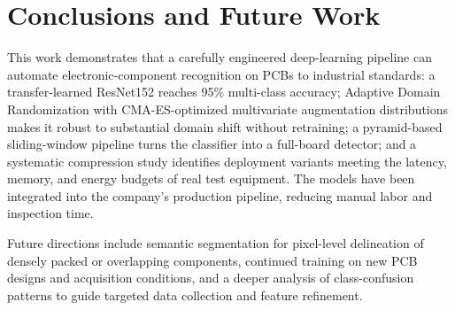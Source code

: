 \documentclass[10pt,twocolumn,a4paper]{article}
\begin{document}
\section{Conclusions and Future Work}
This work demonstrates that a carefully engineered deep-learning pipeline can automate electronic-component recognition on PCBs to industrial standards: a transfer-learned ResNet152 reaches 95\% multi-class accuracy; Adaptive Domain Randomization with CMA-ES-optimized multivariate augmentation distributions makes it robust to substantial domain shift without retraining; a pyramid-based sliding-window pipeline turns the classifier into a full-board detector; and a systematic compression study identifies deployment variants meeting the latency, memory, and energy budgets of real test equipment. The models have been integrated into the company's production pipeline, reducing manual labor and inspection time.

Future directions include semantic segmentation for pixel-level delineation of densely packed or overlapping components, continued training on new PCB designs and acquisition conditions, and a deeper analysis of class-confusion patterns to guide targeted data collection and feature refinement.
\end{document}
